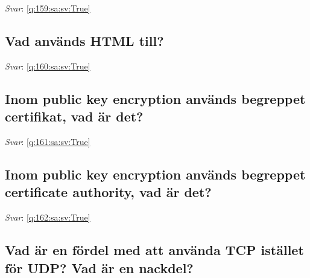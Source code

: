 \documentclass[a4paper,11pt,oneside]{article}
\begin{document}
\begin{sloppypar}
\vspace{1cm}

\textit{Svar}: \autoref{q:159:sa:sv:True}



\subsection{Vad anv\"ands HTML till?}

\label{q:160:sa:sv:False}

\vspace{2cm}

\noindent\makebox[\textwidth]{\hrulefill}

\vspace{1cm}

\textit{Svar}: \autoref{q:160:sa:sv:True}



\subsection{Inom public key encryption anv\"ands begreppet certifikat, vad \"ar det?}

\label{q:161:sa:sv:False}

\vspace{2cm}

\noindent\makebox[\textwidth]{\hrulefill}

\vspace{1cm}

\textit{Svar}: \autoref{q:161:sa:sv:True}



\subsection{Inom public key encryption anv\"ands begreppet certificate authority, vad \"ar det?}

\label{q:162:sa:sv:False}

\vspace{2cm}

\noindent\makebox[\textwidth]{\hrulefill}

\vspace{1cm}

\textit{Svar}: \autoref{q:162:sa:sv:True}



\subsection{Vad \"ar en f\"ordel med att anv\"anda TCP ist\"allet f\"or UDP? Vad \"ar en nackdel?}


\end{sloppypar}
\end{document}
